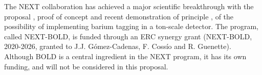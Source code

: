 \indent

The NEXT collaboration has achieved a major scientific breakthrough with the proposal \cite{Nygren_2015}, proof of concept \cite{McDonald:2017izm} and recent demonstration of principle \cite{ rivilla_fluorescent_2020}, of the possibility of implementing barium tagging in a ton-scale detector. The program, called NEXT-BOLD, is funded through an ERC synergy grant (NEXT-BOLD, 2020-2026, granted to J.J. G\'omez-Cadenas, F. Coss\'io and R. Guenette). Although BOLD is a central ingredient in the NEXT program, it has its own funding, and will not be considered in this proposal. 
